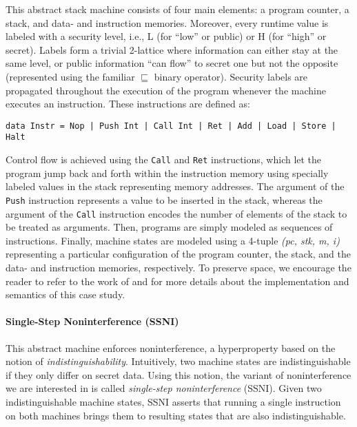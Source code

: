 \documentclass[sigconf,review,anonymous]{acmart}
\begin{document}
This abstract stack machine consists of four main elements: a program counter, a
stack, and data- and instruction memories.
%
Moreover, every runtime value is labeled with a security level, i.e., L (for
``low'' or public) or H (for ``high'' or secret).
%
Labels form a trivial 2-lattice where information can either stay at the same
level, or public information ``can flow'' to secret one but not the opposite
(represented using the familiar $\sqsubseteq$ binary operator).
%
Security labels are propagated throughout the execution of the program whenever
the machine executes an instruction.
%
These instructions are defined as:
%
\begin{verbatim}
data Instr = Nop | Push Int | Call Int | Ret | Add | Load | Store | Halt
\end{verbatim}

\noindent Control flow is achieved using the \texttt{Call} and \texttt{Ret}
instructions, which let the program jump back and forth within the instruction
memory using specially labeled values in the stack representing memory
addresses.
%
The argument of the \texttt{Push} instruction represents a value to be inserted
in the stack, whereas the argument of the \texttt{Call} instruction encodes the
number of elements of the stack to be treated as arguments.
%
Then, programs are simply modeled as sequences of instructions.
%
Finally, machine states are modeled using a 4-tuple \textit{(pc, stk, m, i)}
representing a particular configuration of the program counter, the stack, and
the data- and instruction memories, respectively.
%
To preserve space, we encourage the reader to refer to the work of
\citeauthor{hritcu2013testing} \cite{hritcu2013testing, hrictcu2016testing} and
\citeauthor{lampropoulos2019coverage} \cite{lampropoulos2019coverage} for more
details about the implementation and semantics of this case study.

\paragraph{Single-Step Noninterference (SSNI)}

This abstract machine enforces noninterference, a hyperproperty based on the
notion of \emph{indistinguishability}.
%
Intuitively, two machine states are indistinguishable if they only differ on
secret data.
%
Using this notion, the variant of noninterference we are interested in is called
\emph{single-step noninterference} \cite{hritcu2013testing} (SSNI).
%
Given two indistinguishable machine states, SSNI asserts that running a single
instruction on both machines brings them to resulting states that are also
indistinguishable.
\end{document}
